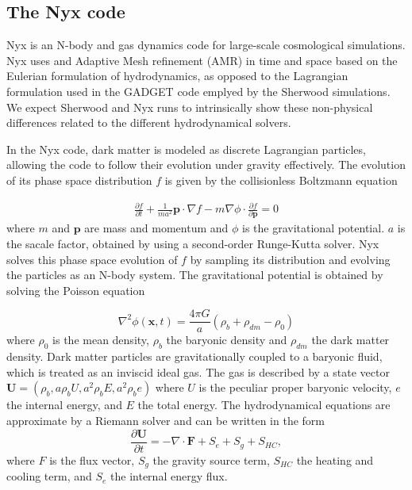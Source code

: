 \subsection{The Nyx code}
Nyx \cite{Almgren_2013} is an N-body and gas dynamics code for large-scale cosmological simulations. Nyx uses and Adaptive Mesh refinement (AMR) in time and space based on the Eulerian formulation of hydrodynamics, as opposed to the Lagrangian formulation used in the GADGET code emplyed by the Sherwood simulations. We expect Sherwood and Nyx runs to intrinsically show these non-physical differences related to the different hydrodynamical solvers.

In the Nyx code, dark matter is modeled as discrete Lagrangian particles, allowing the code to follow their evolution under gravity effectively. The evolution of its phase space distribution $f$ is given by the collisionless Boltzmann equation

\begin{equation}
    \begin{aligned}\frac{\partial f}{\partial t}+\frac{1}{ma^2}\mathbf{p}\cdot\nabla f-m\nabla\phi\cdot\frac{\partial f}{\partial\mathbf{p}}=0\end{aligned}
\end{equation}
where $m$ and $\mathbf{p}$ are mass and momentum and $\phi$ is the gravitational potential. $a$ is the sacale factor, obtained by using a second-order Runge-Kutta solver.
Nyx solves this phase space evolution of $f$ by sampling its distribution and evolving the particles as an N-body system. The gravitational potential is obtained by solving the Poisson equation

\begin{equation}
    \nabla^2\phi(\mathbf{x},t)=\frac{4\pi G}{a}(\rho_b+\rho_{dm}-\rho_0)
\end{equation}
where $\rho_0$ is the mean density, $\rho_b$ the baryonic density and $\rho_{dm}$ the dark matter density.
Dark matter particles are gravitationally coupled to a baryonic fluid, which is treated as an inviscid ideal gas. The gas is described by a state vector $\mathbf{U}=(\rho_b,a\rho_bU,a^2\rho_bE,a^2\rho_be)$ where $U$ is the peculiar proper baryonic velocity, $e$ the internal energy, and $E$ the total energy.
The hydrodynamical equations are approximate by a Riemann solver and can be written in the form
\begin{equation}
    \frac{\partial\mathbf{U}}{\partial t}=-\nabla\cdot\mathbf{F}+S_e+S_g+S_{HC},
\end{equation}
where $F$ is the flux vector, $S_g$ the gravity source term, $S_{HC}$ the heating and cooling term, and $S_e$ the internal energy flux.

